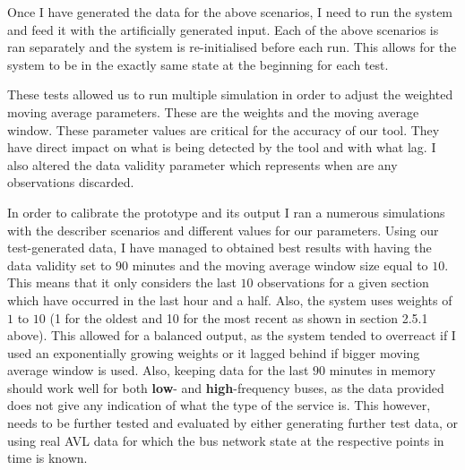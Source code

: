 Once I have generated the data for the above scenarios, I need to run the system and feed it with the artificially generated input. Each of the above scenarios is ran separately and the system is re-initialised before each run. This allows for the system to be in the exactly same state at the beginning for each test.

These tests allowed us to run multiple simulation in order to adjust the weighted moving average parameters. These are the weights and the moving average window. These parameter values are critical for the accuracy of our tool. They have direct impact on what is being detected by the tool and with what lag. I also altered the data validity parameter which represents when are any observations discarded.

In order to calibrate the prototype and its output I ran a numerous simulations with the describer scenarios and different values for our parameters. Using our test-generated data, I have managed to obtained best results with having the data validity set to $90$ minutes and the moving average window size equal to $10$. This means that it only considers the last $10$ observations for a given section which have occurred in the last hour and a half. Also, the system uses weights of $1$ to $10$ (1 for the oldest and 10 for the most recent as shown in section 2.5.1 above). This allowed for a balanced output, as the system tended to overreact if I used an exponentially growing weights or it lagged behind if bigger moving average window is used. Also, keeping data for the last $90$ minutes in memory should work well for both \textbf{low}- and \textbf{high}-frequency buses, as the data provided does not give any indication of what the type of the service is. This however, needs to be further tested and evaluated by either generating further test data, or using real AVL data for which the bus network state at the respective points in time is known.


